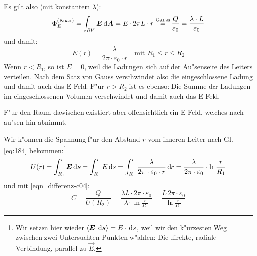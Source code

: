 Es gilt also (mit konstantem $\lambda$):
\begin{equation}
   \label{eqn_differenz-c12}
   \Phi_E^{(\text{Koax})}
=
\int_{\partial V} \boldsymbol{E} \, \mathrm{d} \boldsymbol{A}
=
E \cdot 2 \pi L \cdot  r
\stackrel{\text{\textsc{Gauss}}}{=}
\frac{Q}{\varepsilon_0} = \frac{\lambda \cdot L}{\varepsilon_0}
\end{equation}
und damit:
\begin{equation}
   \label{eqn_differenz-c13}
  \boxed{ E(r) = \frac{\lambda}{2 \pi \cdot \varepsilon_0 \cdot r}} ~ ~ ~
   \text{ mit } R_1 \leq r \leq R_2
\end{equation}
Wenn $r < R_1$, so ist $E = 0$, weil die Ladungen sich auf der
Au"senseite des Leiters verteilen. Nach dem Satz von Gauss
verschwindet also die eingeschlossene Ladung und damit auch das
E-Feld. F"ur $r > R_2$ ist es ebenso: Die Summe der Ladungen im
eingeschlossenen Volumen verschwindet und damit auch das E-Feld.

F"ur den Raum dawischen existiert aber offensichtlich ein E-Feld,
welches nach au"sen hin abnimmt.

Wir k"onnen die Spannung f"ur den Abstand $r$ vom inneren Leiter nach
Gl. \eqref{eq:184} bekommen:\footnote{Wir setzen hier wieder $\langle
  \boldsymbol{E} | \, \mathrm{d} \boldsymbol{s} \rangle = E \cdot \, \mathrm{d} s$, weil wir den
  k"urzesten Weg zwischen zwei Untersuchten Punkten w"ahlen: Die
  direkte, radiale Verbindung, parallel zu $\vec E$.}
\begin{equation}
   \label{eqn_differenz-c14}
   U(r) = \int_{R_1}^r \boldsymbol{E} \, \mathrm{d} \boldsymbol{s} =
\int_{R_1}^r E \, \mathrm{d} s  =
\int_{R_1}^r \frac{\lambda}{2 \pi \cdot \varepsilon_0 \cdot r} \, \mathrm{d} r
=
\frac{\lambda}{2 \pi \cdot \varepsilon_0} \cdot \ln \frac{r}{R_1}
\end{equation}
und mit \eqref{eqn_differenz-c04}:
\begin{equation}
   \label{eqn_differenz-c15}
   C = \frac{Q}{U(R_2)}
   =
   \frac{ \lambda L \cdot 2\pi \cdot \varepsilon_0}{\lambda \cdot \ln
     \frac{r}{R_1}}
=
   \frac{L \, 2\pi  \cdot \varepsilon_0}{\ln
     \frac{r}{R_1}}
\end{equation}


